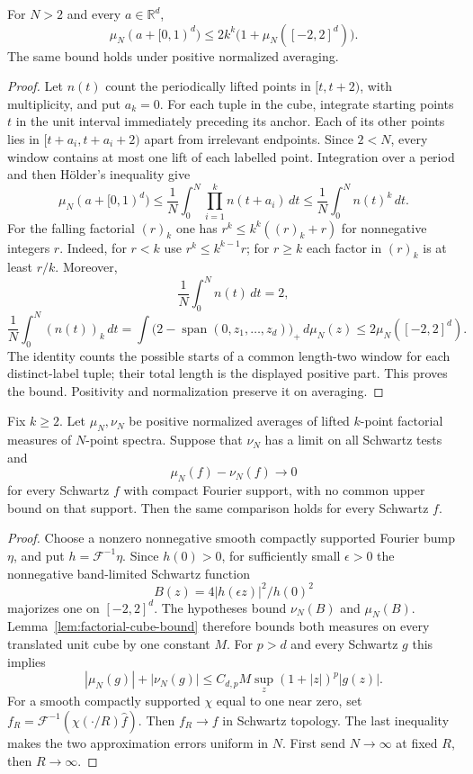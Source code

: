 \begin{lemma}
\label{lem:factorial-cube-bound}
For $N>2$ and every $a\in\mathbb R^d$,
\[
 \mu_N(a+[0,1)^d)\le 2k^k\bigl(1+\mu_N([-2,2]^d)\bigr).
\]
The same bound holds under positive normalized averaging.
\end{lemma}
\begin{proof}
Let $n(t)$ count the periodically lifted points in $[t,t+2)$, with
multiplicity, and put $a_k=0$. For each tuple in the cube, integrate starting
points $t$ in the unit interval immediately preceding its anchor. Each of its
other points lies in $[t+a_i,t+a_i+2)$ apart from irrelevant endpoints.
Since $2<N$, every window contains at most one lift of each labelled point.
Integration over a period and then H\"older's inequality give
\[
 \mu_N(a+[0,1)^d)
 \le\frac1N\int_0^N\prod_{i=1}^k n(t+a_i)\,dt
 \le\frac1N\int_0^N n(t)^k\,dt.
\]
For the falling factorial $(r)_k$ one has
$r^k\le k^k((r)_k+r)$ for nonnegative integers $r$.
Indeed, for $r<k$ use $r^k\le k^{k-1}r$; for $r\ge k$ each factor in
$(r)_k$ is at least $r/k$. Moreover,
\[
 \frac1N\int_0^N n(t)\,dt=2,
\]
\[
 \frac1N\int_0^N(n(t))_k\,dt
 =\int\bigl(2-\operatorname{span}(0,z_1,\ldots,z_d)\bigr)_+\,d\mu_N(z)
 \le2\mu_N([-2,2]^d).
\]
The identity counts the possible starts of a common length-two window for
each distinct-label tuple; their total length is the displayed positive part.
This proves the bound. Positivity and normalization preserve it on averaging.
\end{proof}

\begin{theorem}
\label{thm:factorial-schwartz-extension}
Fix $k\ge2$. Let $\mu_N,\nu_N$ be positive normalized averages of lifted
$k$-point factorial measures of $N$-point spectra. Suppose that $\nu_N$ has a
limit on all Schwartz tests and
\[
 \mu_N(f)-\nu_N(f)\longrightarrow0
\]
for every Schwartz $f$ with compact Fourier support, with no common upper
bound on that support. Then the same comparison holds for every Schwartz $f$.
\end{theorem}
\begin{proof}
Choose a nonzero nonnegative smooth compactly supported Fourier bump $\eta$,
and put $h=\mathcal F^{-1}\eta$. Since $h(0)>0$, for sufficiently small
$\epsilon>0$ the nonnegative band-limited Schwartz function
\[
 B(z)=4|h(\epsilon z)|^2/h(0)^2
\]
majorizes one on $[-2,2]^d$. The hypotheses bound $\nu_N(B)$ and
$\mu_N(B)$. Lemma~\ref{lem:factorial-cube-bound} therefore bounds both
measures on every translated unit cube by one constant $M$.
For $p>d$ and every Schwartz $g$ this implies
\[
 |\mu_N(g)|+|\nu_N(g)|
 \le C_{d,p}M\sup_z(1+|z|)^p|g(z)|.
\]
For a smooth compactly supported $\chi$ equal to one near zero, set
$f_R=\mathcal F^{-1}(\chi(\cdot/R)\widehat f)$.
Then $f_R\to f$ in Schwartz topology. The last inequality makes the two
approximation errors uniform in $N$. First send $N\to\infty$ at fixed $R$,
then $R\to\infty$.
\end{proof}

